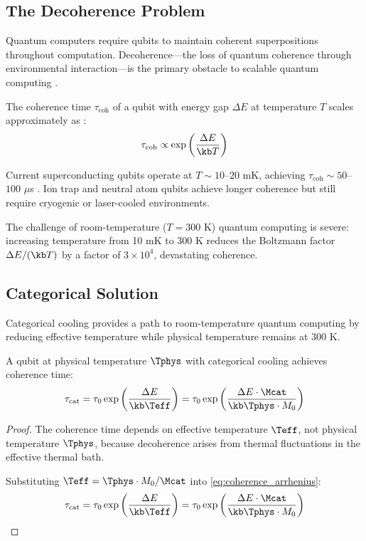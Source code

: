 \subsection{The Decoherence Problem}

Quantum computers require qubits to maintain coherent superpositions throughout computation. Decoherence---the loss of quantum coherence through environmental interaction---is the primary obstacle to scalable quantum computing \cite{zurek2003,schlosshauer2007}.

The coherence time $\tau_{\text{coh}}$ of a qubit with energy gap $\Delta E$ at temperature $T$ scales approximately as \cite{slichter1990}:
\begin{equation}
\tau_{\text{coh}} \propto \exp\left(\frac{\Delta E}{\kb T}\right)
\label{eq:coherence_arrhenius}
\end{equation}

Current superconducting qubits operate at $T \sim 10$--$20$ mK, achieving $\tau_{\text{coh}} \sim 50$--$100$ $\mu$s \cite{kjaergaard2020,arute2019}. Ion trap and neutral atom qubits achieve longer coherence but still require cryogenic or laser-cooled environments.

The challenge of room-temperature ($T = 300$ K) quantum computing is severe: increasing temperature from 10 mK to 300 K reduces the Boltzmann factor $\Delta E/(\kb T)$ by a factor of $3 \times 10^4$, devastating coherence.

\subsection{Categorical Solution}

Categorical cooling provides a path to room-temperature quantum computing by reducing effective temperature while physical temperature remains at 300 K.

\begin{theorem}
\label{thm:coherence_enhancement}
A qubit at physical temperature $\Tphys$ with categorical cooling achieves coherence time:
\begin{equation}
\tau_{\text{cat}} = \tau_0 \exp\left(\frac{\Delta E}{\kb \Teff}\right) = \tau_0 \exp\left(\frac{\Delta E \cdot \Mcat}{\kb \Tphys \cdot M_0}\right)
\label{eq:categorical_coherence}
\end{equation}
\end{theorem}

\begin{proof}
The coherence time depends on effective temperature $\Teff$, not physical temperature $\Tphys$, because decoherence arises from thermal fluctuations in the effective thermal bath.

Substituting $\Teff = \Tphys \cdot M_0/\Mcat$ into \eqref{eq:coherence_arrhenius}:
\begin{equation}
\tau_{\text{cat}} = \tau_0 \exp\left(\frac{\Delta E}{\kb \Teff}\right) = \tau_0 \exp\left(\frac{\Delta E \cdot \Mcat}{\kb \Tphys \cdot M_0}\right)
\end{equation}
\end{proof}

